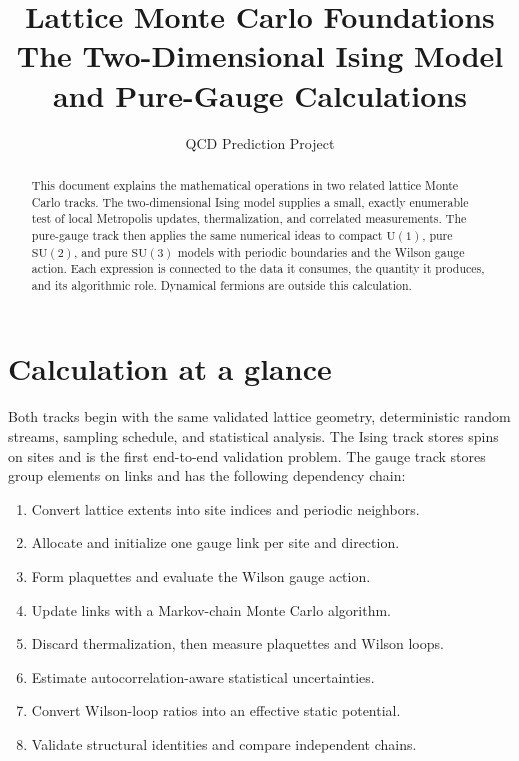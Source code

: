 \documentclass[11pt]{article}
\title{Lattice Monte Carlo Foundations\\
\large The Two-Dimensional Ising Model and Pure-Gauge Calculations}
\author{QCD Prediction Project}
\date{}
\newcommand{\Uone}{\mathrm{U}(1)}
\newcommand{\SUN}[1]{\mathrm{SU}(#1)}
\begin{document}
\maketitle

\begin{abstract}
This document explains the mathematical operations in two related lattice
Monte Carlo tracks.  The two-dimensional Ising model supplies a small,
exactly enumerable test of local Metropolis updates, thermalization, and
correlated measurements.  The pure-gauge track then applies the same numerical
ideas to compact \(\Uone\), pure \(\SUN{2}\), and pure \(\SUN{3}\) models with
periodic boundaries and the Wilson gauge action.  Each expression is connected
to the data it consumes, the quantity it produces, and its algorithmic role.
Dynamical fermions are outside this calculation.
\end{abstract}

\tableofcontents

\section{Calculation at a glance}

Both tracks begin with the same validated lattice geometry, deterministic
random streams, sampling schedule, and statistical analysis.  The Ising track
stores spins on sites and is the first end-to-end validation problem.  The
gauge track stores group elements on links and has the following dependency
chain:

\begin{enumerate}
  \item Convert lattice extents into site indices and periodic neighbors.
  \item Allocate and initialize one gauge link per site and direction.
  \item Form plaquettes and evaluate the Wilson gauge action.
  \item Update links with a Markov-chain Monte Carlo algorithm.
  \item Discard thermalization, then measure plaquettes and Wilson loops.
  \item Estimate autocorrelation-aware statistical uncertainties.
  \item Convert Wilson-loop ratios into an effective static potential.
  \item Validate structural identities and compare independent chains.
\end{enumerate}
\end{document}
